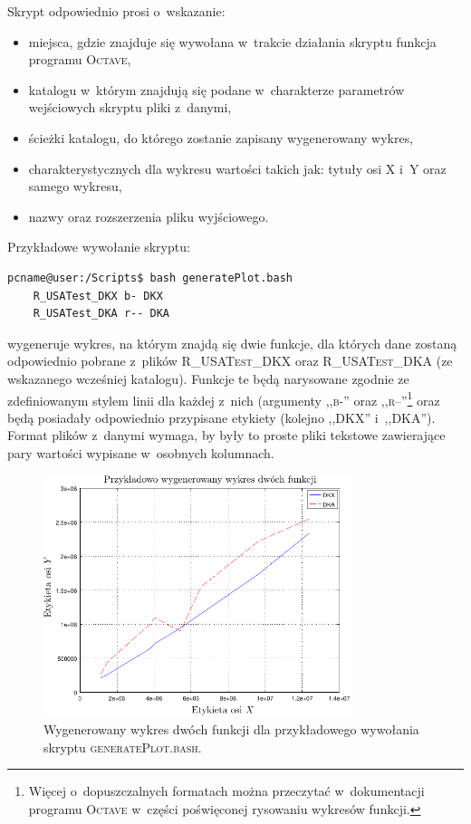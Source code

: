 Skrypt odpowiednio prosi o~wskazanie:

\begin{itemize}
	\item miejsca, gdzie znajduje się wywołana w~trakcie działania skryptu funkcja programu \textsc{Octave},
	\item katalogu w~którym znajdują się podane w~charakterze parametrów wejściowych skryptu pliki z~danymi,
	\item ścieżki katalogu, do którego zostanie zapisany wygenerowany wykres,
	\item charakterystycznych dla wykresu wartości takich jak: tytuły osi \textsc{X} i~\textsc{Y} oraz samego wykresu,
	\item nazwy oraz rozszerzenia pliku wyjściowego.
\end{itemize}

Przykładowe wywołanie skryptu:

\begin{lstlisting}[language=bash]
pcname@user:/Scripts$ bash generatePlot.bash
	R_USATest_DKX b- DKX 
	R_USATest_DKA r-- DKA
\end{lstlisting}
wygeneruje wykres, na którym znajdą się dwie funkcje, dla których dane zostaną odpowiednio pobrane z~plików \textsc{R\_USATest\_DKX} oraz \textsc{R\_USATest\_DKA} (ze wskazanego wcześniej katalogu).
Funkcje te będą narysowane zgodnie ze zdefiniowanym stylem linii dla każdej z~nich (argumenty ,,\textsc{b-}'' oraz ,,\textsc{r--}''\footnote{
	Więcej o~dopuszczalnych formatach można przeczytać w~dokumentacji programu \textsc{Octave} w~części poświęconej rysowaniu wykresów funkcji.
} oraz będą posiadały odpowiednio przypisane etykiety (kolejno ,,\textsc{DKX}'' i~,,\textsc{DKA}'').
Format plików z~danymi wymaga, by były to proste pliki tekstowe zawierające pary wartości wypisane w~osobnych kolumnach.

\begin{figure}[!htbp]
	\null\hfill
	\includegraphics[width=0.8\textwidth]{Appendix_I/GENERATE-PLOT-bash/a_psfrag.pdf}
	\hfill\null
	\caption{
		Wygenerowany wykres dwóch funkcji dla przykładowego wywołania skryptu \textsc{generatePlot.bash}.
	}
\end{figure}


